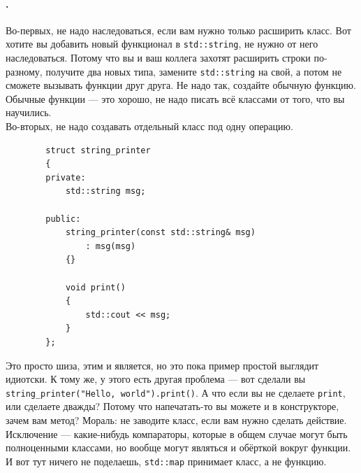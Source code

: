 \documentclass{article}
\begin{document}
    \paragraph{.}
    Во-первых, не надо наследоваться, если вам нужно только расширить класс. Вот хотите вы добавить новый функционал в \texttt{std::string}, не нужно от него наследоваться. Потому что вы и ваш коллега захотят расширить строки по-разному, получите два новых типа, замените \texttt{std::string} на свой, а потом не сможете вызывать функции друг друга. Не надо так, создайте обычную функцию. Обычные функции --- это хорошо, не надо писать всё классами от того, что вы научились.\\
    Во-вторых, не надо создавать отдельный класс под одну операцию.
    \begin{verbatim}
        struct string_printer
        {
        private:
            std::string msg;

        public:
            string_printer(const std::string& msg)
                : msg(msg)
            {}

            void print()
            {
                std::cout << msg;
            }
        };
    \end{verbatim}
    Это просто шиза, этим и является, но это пока пример простой выглядит идиотски. К тому же, у этого есть другая проблема --- вот сделали вы \texttt{string_printer("Hello, world").print()}. А что если вы не сделаете \texttt{print}, или сделаете дважды? Потому что напечатать-то вы можете и в конструкторе, зачем вам метод? Мораль: не заводите класс, если вам нужно сделать действие. Исключение --- какие-нибудь компараторы, которые в общем случае могут быть полноценными классами, но вообще могут являться и обёрткой вокруг функции. И вот тут ничего не поделаешь, \texttt{std::map} принимает класс, а не функцию.
\end{document}
